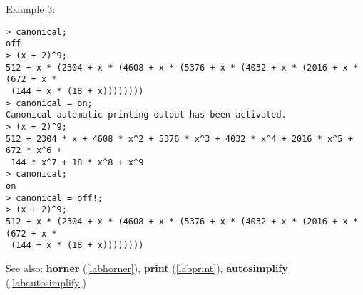 \noindent Example 3: 
\begin{center}\begin{minipage}{15cm}\begin{Verbatim}[frame=single,commandchars=\\\|\~]
> canonical;
off
> (x + 2)^9;
512 + x * (2304 + x * (4608 + x * (5376 + x * (4032 + x * (2016 + x * (672 + x *
 (144 + x * (18 + x))))))))
> canonical = on;
Canonical automatic printing output has been activated.
> (x + 2)^9;
512 + 2304 * x + 4608 * x^2 + 5376 * x^3 + 4032 * x^4 + 2016 * x^5 + 672 * x^6 +
 144 * x^7 + 18 * x^8 + x^9
> canonical;
on
> canonical = off!;
> (x + 2)^9;
512 + x * (2304 + x * (4608 + x * (5376 + x * (4032 + x * (2016 + x * (672 + x *
 (144 + x * (18 + x))))))))
\end{Verbatim}
\end{minipage}\end{center}
See also: \textbf{horner} (\ref{labhorner}), \textbf{print} (\ref{labprint}), \textbf{autosimplify} (\ref{labautosimplify})
